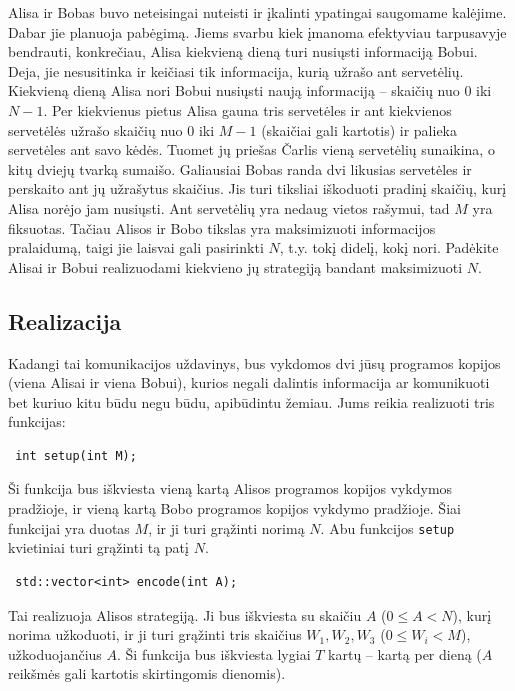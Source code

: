 \documentclass[12pt]{article}
\begin{document}
\renewcommand{\round}{1-oji diena}
\renewcommand{\problemName}{Užduotis: Kalėjimas}
\renewcommand{\lang}{Lithuanian}

\renewcommand{\tl}{$2$ sec.}
\renewcommand{\ml}{$1024$ MB}
\problem{\problemName}

Alisa ir Bobas buvo neteisingai nuteisti ir įkalinti ypatingai saugomame kalėjime. Dabar jie planuoja pabėgimą. Jiems svarbu kiek įmanoma efektyviau tarpusavyje bendrauti, konkrečiau, Alisa kiekvieną dieną turi nusiųsti informaciją Bobui. Deja, jie nesusitinka ir keičiasi tik informacija, kurią užrašo ant servetėlių. Kiekvieną dieną Alisa nori Bobui nusiųsti naują informaciją -- skaičių nuo  $0$ iki $N-1$. Per kiekvienus pietus Alisa gauna tris servetėles ir ant kiekvienos servetėlės užrašo skaičių nuo  $0$ iki $M-1$ (skaičiai gali kartotis) ir palieka servetėles ant savo kėdės. Tuomet jų priešas Čarlis vieną servetėlių sunaikina, o kitų dviejų tvarką sumaišo. Galiausiai Bobas randa dvi likusias servetėles ir perskaito ant jų užrašytus skaičius. Jis turi tiksliai iškoduoti pradinį skaičių, kurį Alisa norėjo jam nusiųsti. Ant servetėlių yra nedaug vietos rašymui, tad $M$ yra fiksuotas. Tačiau Alisos ir Bobo tikslas yra maksimizuoti informacijos pralaidumą, taigi jie laisvai gali pasirinkti $N$, t.y. tokį didelį, kokį nori. Padėkite Alisai ir Bobui realizuodami kiekvieno jų strategiją bandant maksimizuoti $N$.

\subsection{Realizacija}
Kadangi tai komunikacijos uždavinys, bus vykdomos dvi jūsų programos kopijos (viena Alisai ir viena Bobui), kurios negali dalintis informacija ar komunikuoti bet kuriuo kitu būdu negu būdu, apibūdintu žemiau. Jums reikia realizuoti tris funkcijas:

\begin{lstlisting}
 int setup(int M);
\end{lstlisting}

Ši funkcija bus iškviesta vieną kartą Alisos programos kopijos vykdymos pradžioje, ir vieną kartą Bobo programos kopijos vykdymo pradžioje. Šiai funkcijai yra duotas $M$, ir ji turi grąžinti norimą $N$. Abu funkcijos \texttt{setup} kvietiniai turi grąžinti tą patį $N$.

\begin{lstlisting}
 std::vector<int> encode(int A);
\end{lstlisting}

Tai realizuoja Alisos strategiją. Ji bus iškviesta su skaičiu $A$ ($0 \leq A < N$), kurį norima užkoduoti, ir ji turi grąžinti tris skaičius $W_1, W_2, W_3$ ($0 \leq W_i < M$), užkoduojančius $A$. Ši funkcija bus iškviesta lygiai $T$ kartų -- kartą per dieną ($A$ reikšmės gali kartotis skirtingomis dienomis).
\end{document}
